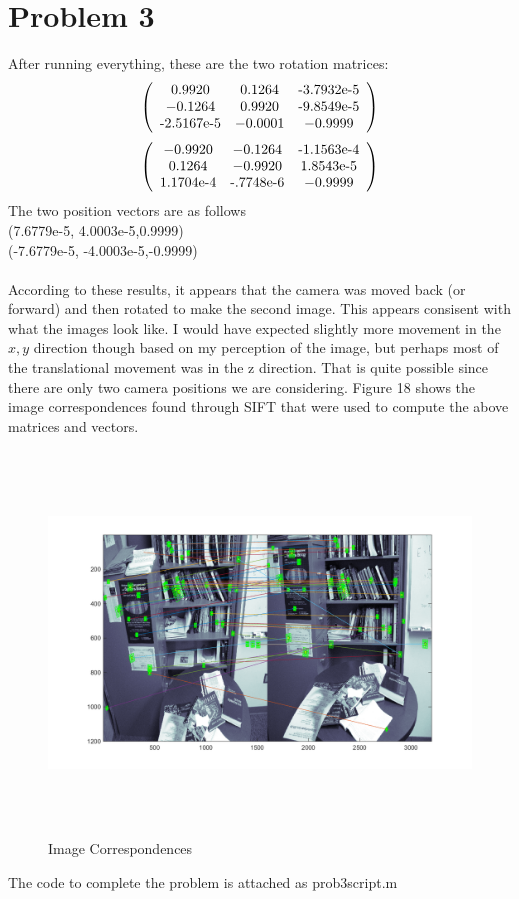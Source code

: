 \documentclass[11pt,psfig]{article}
\begin{document}
\newpage

\section*{Problem 3}

After running everything, these are the two rotation matrices:
\[ \left( \begin{array}{ccc}
0.9920 & 0.1264 & $-3.7932e-5$\\
-0.1264 &  0.9920 & $-9.8549e-5$\\		
$-2.5167e-5$ & -0.0001 & -0.9999 \end{array} \right)\] 
\[ \left( \begin{array}{ccc}
-0.9920 & -0.1264 & $-1.1563e-4$\\
0.1264 &  -0.9920 & $1.8543e-5$\\		
$1.1704e-4$ & $-.7748e-6$ & -0.9999 \end{array} \right)\] 
The two position vectors are as follows\\
(7.6779e-5, 4.0003e-5,0.9999)
\\
(-7.6779e-5, -4.0003e-5,-0.9999)
\\
\\
According to these results, it appears that the camera was moved back (or forward) and then rotated to make the second image. This appears consisent with what the images look like. I would have expected slightly more movement in the $x,y$ direction though based on my perception of the image, but perhaps most of the translational movement was in the z direction. That is quite possible since there are only two camera positions we are considering. Figure 18 shows the image correspondences found through SIFT that were used to compute the above matrices and vectors.

\begin{figure}[H]
\centering
\includegraphics[height=4in]{prob3matches.png}
\caption{Image Correspondences}
\label{p3}
\end{figure}
      
The code to complete the problem is attached as prob3script.m   
        
\end{document}
